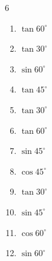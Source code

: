 \begin{multicols}{6}
\begin{enumerate}

  \item $\displaystyle \tan{60^\circ}$


  \item $\displaystyle \tan{30^\circ}$


  \item $\displaystyle \sin{60^\circ}$


  \item $\displaystyle \tan{45^\circ}$

        \phantom{$\displaystyle =1$}

  \item $\displaystyle \tan{30^\circ}$


  \item $\displaystyle \tan{60^\circ}$


\columnbreak %

\resetques

  \item $\displaystyle \sin{45^\circ}$


  \item $\displaystyle \cos{45^\circ}$


  \item $\displaystyle \tan{30^\circ}$


  \item $\displaystyle \sin{45^\circ}$


  \item $\displaystyle \cos{60^\circ}$


  \item $\displaystyle \sin{60^\circ}$


\end{enumerate}
\end{multicols}

